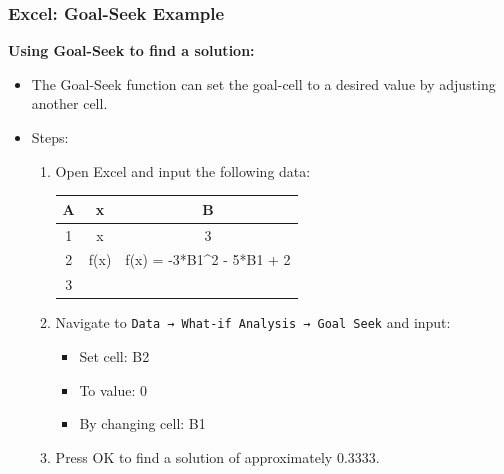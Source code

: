 \begin{frame}[fragile]
    \frametitle{Excel: Goal-Seek Example}

    \textbf{Using Goal-Seek to find a solution:}
    \begin{itemize}
        \item The Goal-Seek function can set the goal-cell to a desired value by adjusting another cell.
        \item Steps:
        \begin{enumerate}
            \item Open Excel and input the following data:

            \begin{tabular}{|c|c|c|}
                \hline
                A & x & B \\
                \hline
                1 & x & 3 \\
                \hline
                2 & f(x) & f(x) = -3*B1\^{}2 - 5*B1 + 2 \\
                \hline
                3 &  & \\
                \hline
            \end{tabular}
            
            \item Navigate to \texttt{Data → What-if Analysis → Goal Seek} and input:
            \begin{itemize}
                \item Set cell: B2
                \item To value: 0
                \item By changing cell: B1
            \end{itemize}
            \item Press OK to find a solution of approximately 0.3333.
        \end{enumerate}
    \end{itemize}
\end{frame}

